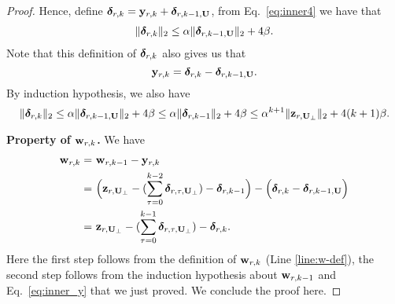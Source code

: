 \begin{proof}
Hence, define $\boldsymbol\delta_{r, k} = \mathbf{y}_{r, k} + \boldsymbol\delta_{r, k-1, \mathbf{U}}$, from Eq.~\eqref{eq:inner4} we have that
\begin{align*}
\|\boldsymbol\delta_{r, k}\|_2 \leq \alpha \|\boldsymbol\delta_{r, k-1, \mathbf{U}}\|_2 + 4\beta.
\end{align*}
Note that this definition of $\boldsymbol\delta_{r, k}$ also gives us that
\begin{equation}\label{eq:inner_y}
\mathbf{y}_{r, k} = \boldsymbol\delta_{r, k} - \boldsymbol\delta_{r, k-1, \mathbf{U}}.
\end{equation}
By induction hypothesis, we also have 
\[
\|\boldsymbol\delta_{r, k}\|_2 \leq \alpha \|\boldsymbol\delta_{r, k-1, \mathbf{U}}\|_2 + 4\beta \leq \alpha\|\boldsymbol\delta_{r, k-1}\|_2 + 4\beta \leq \alpha^{k + 1}\|\mathbf{z}_{r, \mathbf{U}_{\perp}}\|_2 + 4(k+1)\beta.
\]

{\bf Property of $\mathbf{w}_{r,k}$.} We have
\begin{align*}
\mathbf{w}_{r, k} = &~ \mathbf{w}_{r, k-1} - \mathbf{y}_{r,k} \\
= &~ \Big( \mathbf{z}_{r, \mathbf{U}_{\perp}} - (\sum_{\tau=0}^{k-2} \boldsymbol\delta_{r, \tau, \mathbf{U}_{\perp}}) - \boldsymbol\delta_{r, k-1}\Big) - \Big( \boldsymbol\delta_{r, k} - \boldsymbol\delta_{r, k-1, \mathbf{U}} \Big)\\
= &~ \mathbf{z}_{r, \mathbf{U}_{\perp}} - (\sum_{\tau=0}^{k-1} \boldsymbol\delta_{r, \tau, \mathbf{U}_{\perp}}) - \boldsymbol\delta_{r, k}.
\end{align*}
Here the first step follows from the definition of $\mathbf{w}_{r, k}$ (Line \ref{line:w-def}), the second step follows from the induction hypothesis about $\mathbf{w}_{r,k-1}$ and Eq.~\eqref{eq:inner_y} that we just proved. We conclude the proof here.
\end{proof}



